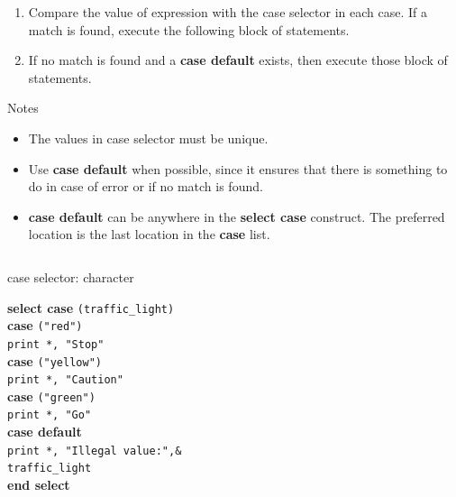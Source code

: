 \documentclass[slidestop,mathserif,compress,xcolor=svgnames]{beamer}
\newenvironment{ablock}[0]
{
\begin{beamerboxesrounded}[upper=uppercol,lower=lowercol,shadow=true]}
{\end{beamerboxesrounded}}
\newenvironment{bblock}[0]
{
\begin{beamerboxesrounded}[upper=uppercol1,lower=lowercol1,shadow=true]}
{\end{beamerboxesrounded}}
\begin{document}
\begin{frame}
\begin{itemize}
\begin{enumerate}
      \item Compare the value of expression with the case selector in each case. If a match is found, execute the following block of statements.
      \item If no match is found and a \textbf{case default} exists, then execute those block of statements.
    \end{enumerate}
  \end{itemize}
  \begin{ablock}{Notes}
    \begin{itemize}
      \item The values in case selector must be unique.
      \item Use \textbf{case default} when possible, since it ensures that there is something to do in case of error or if no match is found.
      \item \textbf{case default} can be anywhere in the \textbf{select case} construct. The preferred location is the last location in the \textbf{case} list.
    \end{itemize}
  \end{ablock}
  \framebreak
  \begin{columns}
    \column{5.5cm}
  \vspace{-0.52cm}
    \begin{bblock}{case selector: character}
      \tiny{
        \begin{tabbing}
          \textbf{se}\=\textbf{lect case} \texttt{(traffic\_light)}\\
          \> \textbf{ca}\=\textbf{se} \texttt{("red")}\\
          \> \> \texttt{print *, "Stop"}\\
          \> \textbf{case} \texttt{("yellow")}\\
          \> \> \texttt{print *, "Caution"}\\
          \> \textbf{case} \texttt{("green")}\\
          \> \> \texttt{print *, "Go"}\\
          \> \textbf{case default} \\
          \> \> \texttt{pr}\=\texttt{int *, "Illegal value:",\&}\\
          \> \>\> \texttt{traffic\_light}\\
          \textbf{end select} 
        \end{tabbing}
      }
    \end{bblock}
    \column{4.5cm}
  \vspace{-0.52cm}

\end{columns}
\end{frame}
\end{document}
